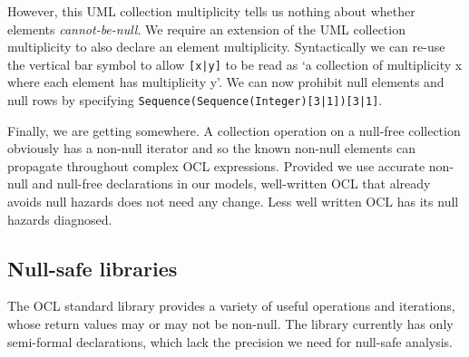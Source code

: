 \documentclass{llncs}
\begin{document}
However, this UML collection multiplicity tells us nothing about whether elements \textit{cannot-be-null}. We require an extension of the UML collection multiplicity to also declare an element multiplicity. Syntactically we can re-use the vertical bar symbol to allow \verb$[x|y]$ to be read as `a collection of multiplicity x where each element has multiplicity y'. We can now prohibit null elements and null rows by specifying \verb$Sequence(Sequence(Integer)[3|1])[3|1]$.

Finally, we are getting somewhere. A collection operation on a null-free collection obviously has a non-null iterator and so the known non-null elements can propagate throughout complex OCL expressions. Provided we use accurate non-null and null-free declarations in our models, well-written OCL that already avoids null hazards does not need any change. Less well written OCL has its null hazards diagnosed.







\subsection{Null-safe libraries}

The OCL standard library provides a variety of useful operations and iterations, whose return values may or may not be non-null. The library currently has only semi-formal declarations, which lack the precision we need for null-safe analysis.
\end{document}
